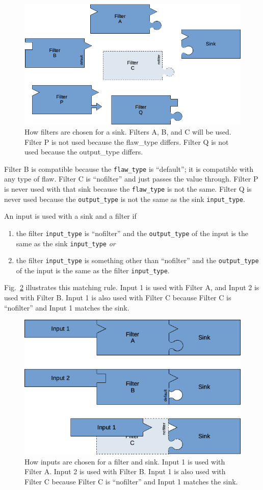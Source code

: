 \begin{figure}[htbp]
  \centerline{\includegraphics[width=.8\linewidth]{fig_filters_and_sinks.png}}
  \caption{How filters are chosen for a sink.  Filters A, B, and C will be used.
    Filter P is not used because the flaw\_type differs.
    Filter Q is not used because the output\_type differs.
  }
  \label{fig:how filters fit a sink}
\end{figure}
Filter B is compatible because the \verb|flaw_type| is
``default''; it is compatible with any type of flaw.  Filter C is ``nofilter'' and
just passes the value through.  Filter P is never used with that sink because
the \verb|flaw_type| is not the same.
Filter Q is never used because the \verb|output_type| is not the same as the
sink \verb|input_type|.

An input is used with a sink and a filter if
\begin{enumerate}[nosep]
\item the filter \verb|input_type| is ``nofilter'' and the \verb|output_type|
  of the input is the same as the sink \verb|input_type| \emph{or}
\item the filter \verb|input_type| is something other than ``nofilter'' and the
  \verb|output_type| of the input is the same as the filter \verb|input_type|.
\end{enumerate}
Fig.~\ref{fig:how inputs fit} illustrates this matching rule.  Input 1 is used with
Filter A, and Input 2 is used with Filter B.  Input 1 is also used with Filter C
because Filter C is ``nofilter'' and Input 1 matches the sink.
\begin{figure}[htbp]
  \centerline{\includegraphics[width=.667\linewidth]{fig_inputs_filters_and_sinks.png}}
  \caption{How inputs are chosen for a filter and sink.  Input 1 is used with
    Filter A.  Input 2 is used with Filter B.  Input 1 is also used with Filter C
    because Filter C is ``nofilter'' and Input 1 matches the sink.
  }
  \label{fig:how inputs fit}
\end{figure}


